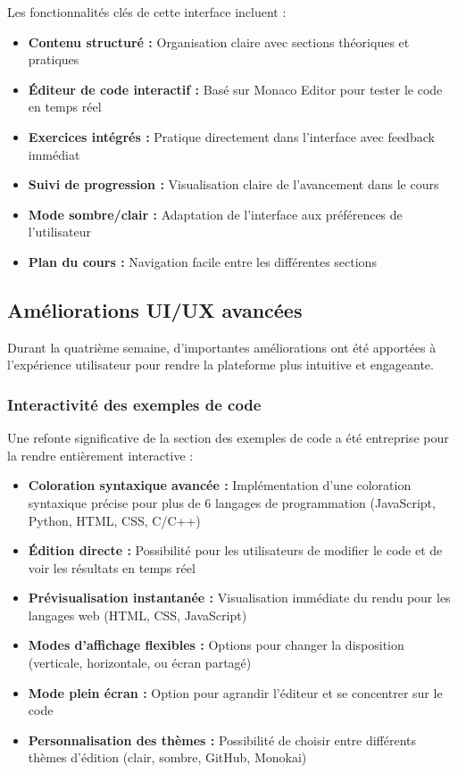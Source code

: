 Les fonctionnalités clés de cette interface incluent :
\begin{itemize}
  \item \textbf{Contenu structuré :} Organisation claire avec sections théoriques et pratiques
  \item \textbf{Éditeur de code interactif :} Basé sur Monaco Editor pour tester le code en temps réel
  \item \textbf{Exercices intégrés :} Pratique directement dans l'interface avec feedback immédiat
  \item \textbf{Suivi de progression :} Visualisation claire de l'avancement dans le cours
  \item \textbf{Mode sombre/clair :} Adaptation de l'interface aux préférences de l'utilisateur
  \item \textbf{Plan du cours :} Navigation facile entre les différentes sections
\end{itemize}

\subsection{Améliorations UI/UX avancées}

Durant la quatrième semaine, d'importantes améliorations ont été apportées à l'expérience utilisateur pour rendre la plateforme plus intuitive et engageante.

\subsubsection{Interactivité des exemples de code}

Une refonte significative de la section des exemples de code a été entreprise pour la rendre entièrement interactive :
\begin{itemize}
    \item \textbf{Coloration syntaxique avancée :} Implémentation d'une coloration syntaxique précise pour plus de 6 langages de programmation (JavaScript, Python, HTML, CSS, C/C++)
    \item \textbf{Édition directe :} Possibilité pour les utilisateurs de modifier le code et de voir les résultats en temps réel
    \item \textbf{Prévisualisation instantanée :} Visualisation immédiate du rendu pour les langages web (HTML, CSS, JavaScript)
    \item \textbf{Modes d'affichage flexibles :} Options pour changer la disposition (verticale, horizontale, ou écran partagé)
    \item \textbf{Mode plein écran :} Option pour agrandir l'éditeur et se concentrer sur le code
    \item \textbf{Personnalisation des thèmes :} Possibilité de choisir entre différents thèmes d'édition (clair, sombre, GitHub, Monokai)
\end{itemize}

